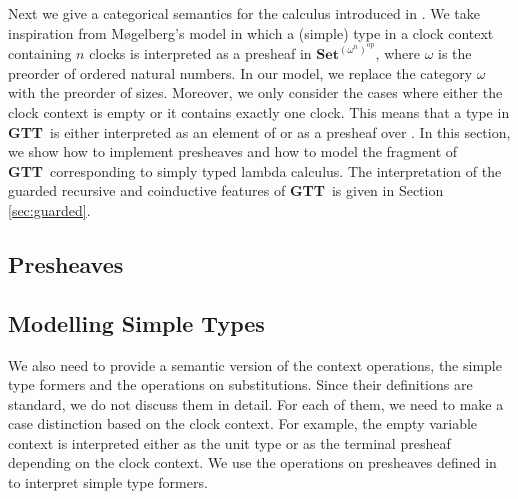 \documentclass[a4paper,UKenglish,cleveref, autoref,numberwithinsect]{lipics-v2019}
\newcommand{\AD}[1]{\AgdaDatatype{#1}}
\newcommand{\IC}{\AgdaInductiveConstructor}
\newcommand{\F}{\AgdaFunction}
\newcommand{\GTT}{\textbf{GTT}}
\newcommand{\Set}{\mathbf{Set}}
\begin{document}
Next we give a categorical semantics for the calculus introduced in
.  We take inspiration from M{\o}gelberg's model
\cite{Mogelberg14} in which a (simple) type in a clock context
containing $n$ clocks is interpreted
as a presheaf in $\Set^{(\omega^n)^{\text{op}}}$, where $\omega$ is
the preorder of ordered natural numbers. In our model, we replace the
category $\omega$ with the preorder of sizes. Moreover, we only
consider the cases where either the clock context is empty or it
contains exactly one clock. This means that a type in \GTT\ is either
interpreted as an element of \F{Set} or as a presheaf over \F{Size}. 
In this section, we show how to implement presheaves and how to model
the fragment of \GTT\ corresponding to simply typed lambda
calculus. The interpretation of the guarded recursive and coinductive
features of \GTT\ is given in Section \ref{sec:guarded}.

\subsection{Presheaves}
\label{sec:presheaves}







\subsection{Modelling Simple Types}
\label{sec:kripke}




%

We also need to provide a semantic version of 
the context operations, the simple type formers and the operations on substitutions.
Since their definitions are standard, we do not discuss them in detail.
For each of them, we need to make a case distinction based on the clock context.
For example, the empty variable context \IC{•} is interpreted either as the unit type
or as the terminal presheaf depending on the clock context.
We use the operations on presheaves defined in  to interpret simple type formers.

\end{document}
